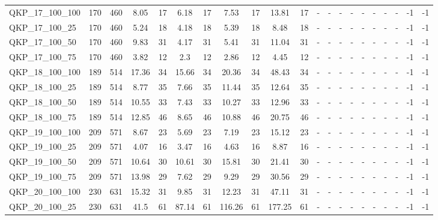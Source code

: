 \begin{sidewaystable}[!ht]
{\begin{tabular}{lcccccccccccccccccccc}
QKP\_17\_100\_100 & 170 & 460 & 8.05 & 17 &  \textcolor{blue2}{6.18} & 17 & 7.53 & 17 & 13.81 & 17 &  - &  - &  - &  - &  - &  - &  - &  - & -1 & -1 \\
QKP\_17\_100\_25 & 170 & 460 & 5.24 & 18 &  \textcolor{blue2}{4.18} & 18 & 5.39 & 18 & 8.48 & 18 &  - &  - &  - &  - &  - &  - &  - &  - & -1 & -1 \\
QKP\_17\_100\_50 & 170 & 460 & 9.83 & 31 &  \textcolor{blue2}{4.17} & 31 & 5.41 & 31 & 11.04 & 31 &  - &  - &  - &  - &  - &  - &  - &  - & -1 & -1 \\
QKP\_17\_100\_75 & 170 & 460 & 3.82 & 12 &  \textcolor{blue2}{2.3} & 12 & 2.86 & 12 & 4.45 & 12 &  - &  - &  - &  - &  - &  - &  - &  - & -1 & -1 \\
QKP\_18\_100\_100 & 189 & 514 & 17.36 & 34 &  \textcolor{blue2}{15.66} & 34 & 20.36 & 34 & 48.43 & 34 &  - &  - &  - &  - &  - &  - &  - &  - & -1 & -1 \\
QKP\_18\_100\_25 & 189 & 514 & 8.77 & 35 &  \textcolor{blue2}{7.66} & 35 & 11.44 & 35 & 12.64 & 35 &  - &  - &  - &  - &  - &  - &  - &  - & -1 & -1 \\
QKP\_18\_100\_50 & 189 & 514 & 10.55 & 33 &  \textcolor{blue2}{7.43} & 33 & 10.27 & 33 & 12.96 & 33 &  - &  - &  - &  - &  - &  - &  - &  - & -1 & -1 \\
QKP\_18\_100\_75 & 189 & 514 & 12.85 & 46 &  \textcolor{blue2}{8.65} & 46 & 10.88 & 46 & 20.75 & 46 &  - &  - &  - &  - &  - &  - &  - &  - & -1 & -1 \\
QKP\_19\_100\_100 & 209 & 571 & 8.67 & 23 &  \textcolor{blue2}{5.69} & 23 & 7.19 & 23 & 15.12 & 23 &  - &  - &  - &  - &  - &  - &  - &  - & -1 & -1 \\
QKP\_19\_100\_25 & 209 & 571 & 4.07 & 16 &  \textcolor{blue2}{3.47} & 16 & 4.63 & 16 & 8.87 & 16 &  - &  - &  - &  - &  - &  - &  - &  - & -1 & -1 \\
QKP\_19\_100\_50 & 209 & 571 & 10.64 & 30 &  \textcolor{blue2}{10.61} & 30 & 15.81 & 30 & 21.41 & 30 &  - &  - &  - &  - &  - &  - &  - &  - & -1 & -1 \\
QKP\_19\_100\_75 & 209 & 571 & 13.98 & 29 &  \textcolor{blue2}{7.62} & 29 & 9.29 & 29 & 30.56 & 29 &  - &  - &  - &  - &  - &  - &  - &  - & -1 & -1 \\
QKP\_20\_100\_100 & 230 & 631 & 15.32 & 31 &  \textcolor{blue2}{9.85} & 31 & 12.23 & 31 & 47.11 & 31 &  - &  - &  - &  - &  - &  - &  - &  - & -1 & -1 \\
QKP\_20\_100\_25 & 230 & 631 &  \textcolor{blue2}{41.5} & 61 & 87.14 & 61 & 116.26 & 61 & 177.25 & 61 &  - &  - &  - &  - &  - &  - &  - &  - & -1 & -1 \\

\end{tabular}}
\end{sidewaystable}
